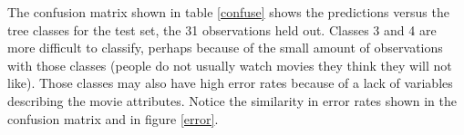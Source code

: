 The confusion matrix shown in table \ref{confuse} shows the predictions versus the tree classes for the test set, the 31 observations held out. Classes 3 and 4 are more difficult to classify, perhaps because of the small amount of observations with those classes (people do not usually watch movies they think they will not like). Those classes may also have high error rates because of a lack of variables describing the movie attributes. Notice the similarity in error rates shown in the confusion matrix and in figure \ref{error}.
